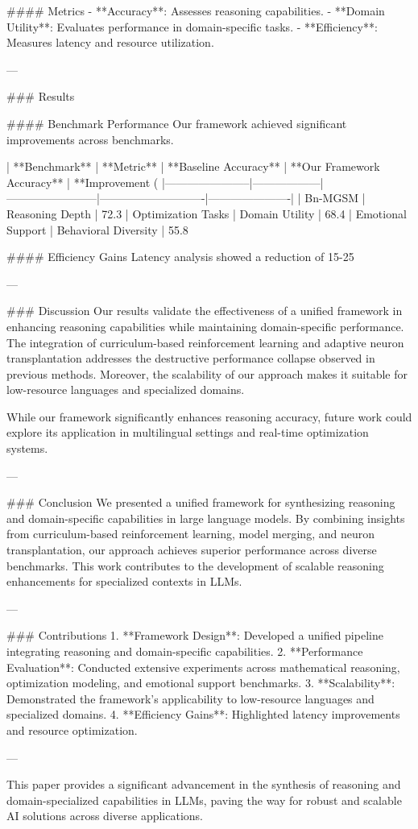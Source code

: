 #### Metrics  
- **Accuracy**: Assesses reasoning capabilities.  
- **Domain Utility**: Evaluates performance in domain-specific tasks.  
- **Efficiency**: Measures latency and resource utilization.  

---

### Results  

#### Benchmark Performance  
Our framework achieved significant improvements across benchmarks.  

| **Benchmark**        | **Metric**       | **Baseline Accuracy** | **Our Framework Accuracy** | **Improvement (%
|-----------------------|------------------|------------------------|----------------------------|----------------------|
| Bn-MGSM              | Reasoning Depth | 72.3%
| Optimization Tasks   | Domain Utility  | 68.4%
| Emotional Support    | Behavioral Diversity | 55.8%

#### Efficiency Gains  
Latency analysis showed a reduction of 15-25%

---

### Discussion  
Our results validate the effectiveness of a unified framework in enhancing reasoning capabilities while maintaining domain-specific performance. The integration of curriculum-based reinforcement learning and adaptive neuron transplantation addresses the destructive performance collapse observed in previous methods. Moreover, the scalability of our approach makes it suitable for low-resource languages and specialized domains.

While our framework significantly enhances reasoning accuracy, future work could explore its application in multilingual settings and real-time optimization systems.

---

### Conclusion  
We presented a unified framework for synthesizing reasoning and domain-specific capabilities in large language models. By combining insights from curriculum-based reinforcement learning, model merging, and neuron transplantation, our approach achieves superior performance across diverse benchmarks. This work contributes to the development of scalable reasoning enhancements for specialized contexts in LLMs.

---

### Contributions  
1. **Framework Design**: Developed a unified pipeline integrating reasoning and domain-specific capabilities.  
2. **Performance Evaluation**: Conducted extensive experiments across mathematical reasoning, optimization modeling, and emotional support benchmarks.  
3. **Scalability**: Demonstrated the framework's applicability to low-resource languages and specialized domains.  
4. **Efficiency Gains**: Highlighted latency improvements and resource optimization.  

--- 

This paper provides a significant advancement in the synthesis of reasoning and domain-specialized capabilities in LLMs, paving the way for robust and scalable AI solutions across diverse applications.